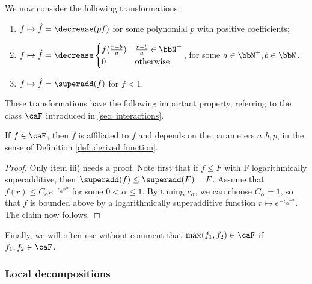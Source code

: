 We now consider the following transformations:
\begin{enumerate}
	\item $f\mapsto\hat{f}= \decrease(p f)$ for some polynomial $p$ with positive coefficients;
	\item {$f\mapsto\hat{f} = \decrease \begin{cases}f(\tfrac{r-b}{a}) &  \tfrac{r-b}{a}\in \bbN^+ \\    0 & \text{otherwise} \end{cases}  $},  for some  $a\in\bbN^+,b\in\bbN$. 
	\item  $f\mapsto\hat{f}= \superadd(f)$ for $f <1$. 
\end{enumerate}
These transformations have the following important property, referring to the class $\caF$ introduced in \ref{sec: interactions}.  
\begin{lemma}
	If $f\in \caF$, then $\hat{f}$ is affiliated to $f$ and depends on the parameters $a,b,p$, in the sense of Definition \ref{def: derived function}. 
\end{lemma}
\begin{proof}
	Only item iii) needs a proof. 
	Note first that if $f\leq F$ with F logarithmically superadditive, then $\superadd(f)\leq\superadd(F)=F$. Assume that  $f(r) \leq C_\alpha e^{-c_\alpha r^{\alpha}}$ for some $0<\alpha\leq 1$. By tuning $c_\alpha$, we can choose $C_\alpha=1$, so that $f$ is bounded above by a logarithmically superadditive function $r\mapsto e^{-c_\alpha r^{\alpha}}$. The claim now follows.
\end{proof}
Finally, we will often use without comment that $\max(f_1,f_2) \in\caF$ if $f_1,f_2 \in\caF$. 


\subsubsection{Local decompositions}

